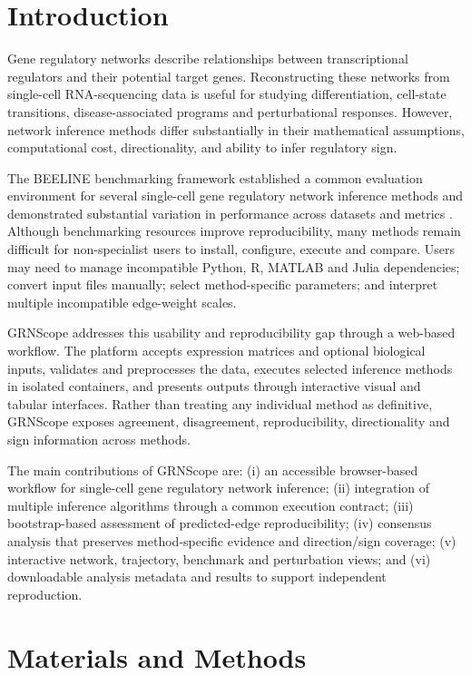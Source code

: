 \documentclass[unnumsec,webpdf,modern,large]{oup-authoring-template}%
\begin{document}
\section{Introduction}

Gene regulatory networks describe relationships between transcriptional regulators and their potential target genes. Reconstructing these networks from single-cell RNA-sequencing data is useful for studying differentiation, cell-state transitions, disease-associated programs and perturbational responses. However, network inference methods differ substantially in their mathematical assumptions, computational cost, directionality, and ability to infer regulatory sign.

The BEELINE benchmarking framework established a common evaluation environment for several single-cell gene regulatory network inference methods and demonstrated substantial variation in performance across datasets and metrics \citep{pratapa2020benchmarking}. Although benchmarking resources improve reproducibility, many methods remain difficult for non-specialist users to install, configure, execute and compare. Users may need to manage incompatible Python, R, MATLAB and Julia dependencies; convert input files manually; select method-specific parameters; and interpret multiple incompatible edge-weight scales.

GRNScope addresses this usability and reproducibility gap through a web-based workflow. The platform accepts expression matrices and optional biological inputs, validates and preprocesses the data, executes selected inference methods in isolated containers, and presents outputs through interactive visual and tabular interfaces. Rather than treating any individual method as definitive, GRNScope exposes agreement, disagreement, reproducibility, directionality and sign information across methods.

The main contributions of GRNScope are: (i) an accessible browser-based workflow for single-cell gene regulatory network inference; (ii) integration of multiple inference algorithms through a common execution contract; (iii) bootstrap-based assessment of predicted-edge reproducibility; (iv) consensus analysis that preserves method-specific evidence and direction/sign coverage; (v) interactive network, trajectory, benchmark and perturbation views; and (vi) downloadable analysis metadata and results to support independent reproduction.

\section{Materials and Methods}
\end{document}
